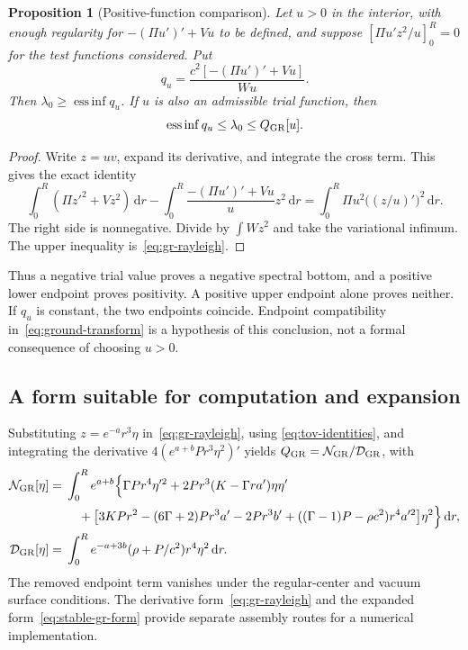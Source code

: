 \documentclass[11pt,letterpaper]{article}
\newcommand{\essinf}{\operatorname*{ess\,inf}}
\newcommand{\dd}{\,\mathrm d}
\newtheorem{proposition}[theorem]{Proposition}
\theoremstyle{definition}
\numberwithin{equation}{section}
\begin{document}
\begin{proposition}[Positive-function comparison]
Let $u>0$ in the interior, with enough regularity for
$-(\Pi u')'+Vu$ to be defined, and suppose
$[\Pi u'z^2/u]_0^R=0$ for the test functions considered. Put
\[
 q_u=\frac{c^2[-(\Pi u')'+Vu]}{Wu}.
\]
Then $\lambda_0\ge\essinf q_u$. If $u$ is also an admissible trial
function, then
\begin{equation}
 \essinf q_u\le\lambda_0\le Q_{\rm GR}[u].
 \label{eq:gr-enclosure}
\end{equation}
\end{proposition}
\begin{proof}
Write $z=u v$, expand its derivative, and integrate the cross term. This
gives the exact identity
\begin{equation}
 \int_0^R(\Pi z'^2+Vz^2)\dd r
 -\int_0^R\frac{-(\Pi u')'+Vu}{u}z^2\dd r
 =\int_0^R\Pi u^2\bigl((z/u)'\bigr)^2\dd r.
 \label{eq:ground-transform}
\end{equation}
The right side is nonnegative. Divide by $\int Wz^2$ and take the
variational infimum. The upper inequality is~\eqref{eq:gr-rayleigh}.
\end{proof}

Thus a negative trial value proves a negative spectral bottom, and a
positive lower endpoint proves positivity. A positive upper endpoint
alone proves neither. If $q_u$ is constant, the two endpoints coincide.
Endpoint compatibility in~\eqref{eq:ground-transform} is a hypothesis of
this conclusion, not a formal consequence of choosing $u>0$.

\subsection{A form suitable for computation and expansion}

Substituting $z=e^{-a}r^3\eta$ in~\eqref{eq:gr-rayleigh}, using
\eqref{eq:tov-identities}, and integrating the derivative
$4(e^{a+b}Pr^3\eta^2)'$ yields $Q_{\rm GR}=\mathcal N_{\rm GR}/\mathcal D_{\rm GR}$,
with
\begin{align}
 \mathcal N_{\rm GR}[\eta]
 ={}&\int_0^R e^{a+b}\Bigl\{\Gamma P r^4\eta'^2
       +2Pr^3(K-\Gamma r a')\eta\eta'\notag\\
 &\quad+\bigl[3KPr^2-(6\Gamma+2)Pr^3a'-2Pr^3b'
       +((\Gamma-1)P-\rho c^2)r^4a'^2\bigr]\eta^2\Bigr\}\dd r,
 \label{eq:stable-gr-form}\\
 \mathcal D_{\rm GR}[\eta]
 ={}&\int_0^R e^{-a+3b}(\rho+P/c^2)r^4\eta^2\dd r.
 \label{eq:stable-gr-mass}
\end{align}
The removed endpoint term vanishes under the regular-center and vacuum
surface conditions. The derivative form~\eqref{eq:gr-rayleigh} and the
expanded form~\eqref{eq:stable-gr-form} provide separate assembly routes
for a numerical implementation.
\end{document}
